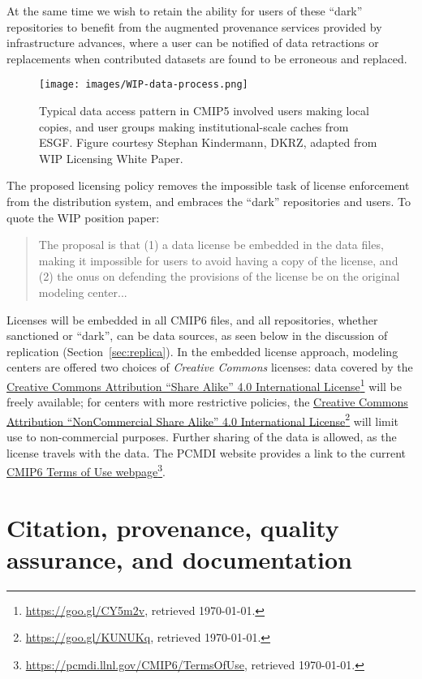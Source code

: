 \documentclass[gmd,manuscript]{copernicus}
\newcommand{\pllabel}[1]{\label{p-#1}\linelabel{l-#1}}
\newcommand{\urlref}[2] {\href{#1}{#2}\footnote{\url{#1}, retrieved \today.}}
\begin{document}
At the same time we wish to retain the ability for users of these ``dark''
repositories to benefit from the augmented provenance services provided by
infrastructure advances, where a user can be notified of data retractions or
replacements when contributed datasets are found to be
erroneous and replaced.

\begin{figure*}
  \begin{center}
    \texttt{[image: images/WIP-data-process.png]}
  \end{center}
  \caption{Typical data access pattern in CMIP5 involved users making
    local copies, and user groups making institutional-scale caches
    from ESGF. Figure courtesy Stephan Kindermann, DKRZ, adapted from
    WIP Licensing White Paper.}
  \label{fig:dark}
\end{figure*}

The proposed licensing policy removes the impossible
task of license enforcement from the distribution system, and embraces
the ``dark'' repositories and users. To quote the WIP position paper:

\begin{quote}
  The proposal is that (1) a data license be embedded in the data
  files, making it impossible for users to avoid having a copy of the
  license, and (2) the onus on defending the provisions of the license
  be on the original modeling center...
\end{quote}

\pllabel{RC2-27}
Licenses will be embedded in all CMIP6 files, and all repositories, whether
sanctioned or ``dark'', can be data sources, as seen below in the
discussion of replication (Section~\ref{sec:replica}).
\pllabel{RC2-30}
In the embedded license approach, modeling centers are offered two
choices of \emph{Creative Commons} licenses: data covered by the
\urlref{https://goo.gl/CY5m2v}{Creative Commons Attribution ``Share
  Alike'' 4.0 International License} will be freely available; for
centers with more restrictive policies, the
\urlref{https://goo.gl/KUNUKq}{Creative Commons Attribution
  ``NonCommercial Share Alike'' 4.0 International License} will limit use 
to non-commercial purposes. Further sharing of the data
is allowed, as the license travels with the data. The PCMDI website
provides a link to the current
\urlref{https://pcmdi.llnl.gov/CMIP6/TermsOfUse}{CMIP6 Terms of Use
  webpage}.

\section{Citation, provenance, quality assurance, and documentation}
\label{sec:cite}
\end{document}
